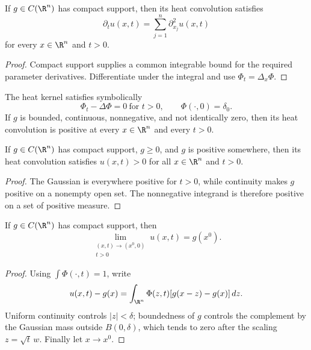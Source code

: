 \begin{lemma}
\label{lem:heat-convolution-solves-heat}
\leanok
If $g\in C(\R^n)$ has compact support, then its heat convolution satisfies
$$\partial_tu(x,t)=\sum_{j=1}^n\partial_{x_j}^2u(x,t)$$
for every $x\in\R^n$ and $t>0$.
\end{lemma}
\begin{proof}
\leanok
\sketch Compact support supplies a common integrable bound for the required
parameter derivatives. Differentiate under the integral and use
$\Phi_t=\Delta_x\Phi$.
\end{proof}

\begin{remark}
\label{rem:heat-equation-infinite-propagation-speed}
The heat kernel satisfies symbolically
$$\Phi_t-\Delta\Phi=0\ \text{for }t>0,
\qquad
\Phi(\cdot,0)=\delta_0.$$
If $g$ is bounded, continuous, nonnegative, and not identically zero, then its
heat convolution is positive at every $x\in\R^n$ and every $t>0$.
\end{remark}

\begin{lemma}
\label{lem:heat-infinite-propagation-speed}
\leanok
If $g\in C(\R^n)$ has compact support, $g\ge0$, and $g$ is positive somewhere,
then its heat convolution satisfies $u(x,t)>0$ for all $x\in\R^n$ and $t>0$.
\end{lemma}
\begin{proof}
\leanok
\sketch The Gaussian is everywhere positive for $t>0$, while continuity makes
$g$ positive on a nonempty open set. The nonnegative integrand is therefore
positive on a set of positive measure.
\end{proof}

\begin{lemma}
\label{lem:heat-convolution-attains-initial-data}
\leanok
If $g\in C(\R^n)$ has compact support, then
$$\lim_{\substack{(x,t)\to(x^0,0)\\t>0}}u(x,t)=g(x^0).$$
\end{lemma}
\begin{proof}
\leanok
\sketch Using $\int\Phi(\cdot,t)=1$, write
$$u(x,t)-g(x)=\int_{\R^n}\Phi(z,t)[g(x-z)-g(x)]\,dz.$$
Uniform continuity controls $|z|<\delta$; boundedness of $g$ controls the
complement by the Gaussian mass outside $B(0,\delta)$, which tends to zero
after the scaling $z=\sqrt t\,w$. Finally let $x\to x^0$.
\end{proof}

